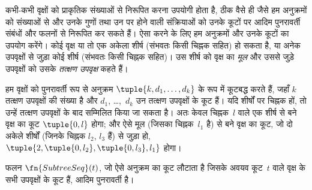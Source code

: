 \documentclass[../../../include/open-logic-section]{subfiles}
\begin{document}

कभी-कभी वृक्षों को प्राकृतिक संख्याओं से निरूपित करना उपयोगी होता है,
ठीक वैसे ही जैसे हम अनुक्रमों को संख्याओं से और उनके गुणों तथा उन पर होने
वाली संक्रियाओं को उनके कूटों पर आदिम पुनरावर्ती संबंधों और फलनों से
निरूपित कर सकते हैं। ऐसा करने के लिए हम अनुक्रमों और उनके कूटों का उपयोग
करेंगे। कोई वृक्ष या तो एक अकेला शीर्ष (संभवतः किसी चिह्नक सहित) हो सकता
है, या अनेक उपवृक्षों से जुड़ा कोई शीर्ष (संभवतः किसी चिह्नक सहित)। उस
शीर्ष को वृक्ष का \emph{मूल} और उससे जुड़े उपवृक्षों को उसके
\emph{तत्क्षण उपवृक्ष} कहते हैं।

हम वृक्षों को पुनरावर्ती रूप से अनुक्रम $\tuple{k, d_1, \dots, d_k}$
के रूप में कूटबद्ध करते हैं, जहाँ $k$ तत्क्षण उपवृक्षों की संख्या है और
$d_1$, \dots,~$d_k$ उन तत्क्षण उपवृक्षों के कूट हैं। यदि शीर्षों पर
चिह्नक हों, तो उन्हें तत्क्षण उपवृक्षों के बाद सम्मिलित किया जा सकता है।
अतः केवल चिह्नक~$l$ वाले एक शीर्ष से बने वृक्ष का कूट $\tuple{0,l}$
होगा; और ऐसे मूल (जिसका चिह्नक~$l_1$ है) से बने वृक्ष का कूट, जो दो
अकेले शीर्षों (जिनके चिह्नक $l_2$, $l_3$ हैं) से जुड़ा हो,
$\tuple{2,
  \tuple{0, l_2}, \tuple{0, l_3}, l_1}$ होगा।

\begin{prop}
  फलन $\fn{SubtreeSeq}(t)$, जो ऐसे अनुक्रम का कूट लौटाता है जिसके अवयव
  कूट~$t$ वाले वृक्ष के सभी उपवृक्षों के कूट हैं, आदिम पुनरावर्ती है।
\end{prop}
\end{document}
